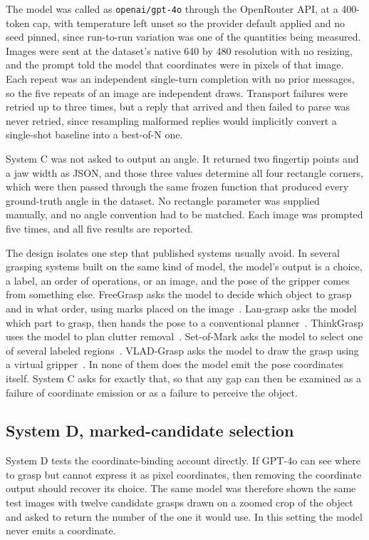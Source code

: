 \documentclass[12pt,letterpaper]{article}
\begin{document}
The model was called as
\texttt{openai/gpt-4o} through the OpenRouter API, at a 400-token cap,
with temperature left unset so the provider default applied and no seed
pinned, since run-to-run variation was one of the quantities being measured. Images were sent at the dataset's native 640 by 480
resolution with no resizing, and the prompt told the model that
coordinates were in pixels of that image. Each repeat was an
independent single-turn completion with no prior messages, so the five repeats of an image are independent draws. Transport failures were retried up to three times, but a
reply that arrived and then failed to parse was never retried, since resampling malformed replies would implicitly convert a
single-shot baseline into a best-of-N one.

System C was not asked to output an angle. It returned two fingertip
points and a jaw width as JSON, and those three values determine all
four rectangle corners, which were then passed through the same frozen
function that produced every ground-truth angle in the dataset. No
rectangle parameter was supplied manually, and no angle convention had
to be matched. Each image was prompted five times, and all five results
are reported.

The design isolates one step that published systems usually avoid. In
several grasping systems built on the same kind of model, the model's
output is a choice, a label, an order of operations, or an image, and
the pose of the gripper comes from something else. FreeGrasp asks the
model to decide which object to grasp and in what order, using marks
placed on the image~\cite{jiao2025}. Lan-grasp asks the model which part
to grasp, then hands the pose to a conventional
planner~\cite{mirjalili2023}. ThinkGrasp uses the model to plan clutter
removal~\cite{qian2024}. Set-of-Mark asks the model to select one of
several labeled regions~\cite{yang2024}. VLAD-Grasp asks the model to
draw the grasp using a virtual gripper~\cite{kulshrestha2025}. In none
of them does the model emit the pose coordinates itself. System C asks
for exactly that, so that any gap can then be examined as a failure of
coordinate emission or as a failure to perceive the object.

\subsection{System D, marked-candidate selection}

System D tests the coordinate-binding account directly. If GPT-4o can
see where to grasp but cannot express it as pixel coordinates, then
removing the coordinate output should recover its choice. The same model
was therefore shown the same test images with twelve candidate grasps
drawn on a zoomed crop of the object and asked to return the number of
the one it would use. In this setting the model never emits a
coordinate.
\end{document}

